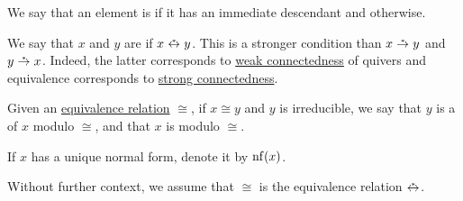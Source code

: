 \begin{definition}
\begin{thmenum}
    We say that an element is  if it has an immediate descendant and  otherwise.

     We say that \( x \) and \( y \) are  if \( x \reloset {*} \leftrightarrow y \). This is a stronger condition than \( x \reloset {*} \to y \) and \( y \reloset {*} \to x \). Indeed, the latter corresponds to \hyperref[def:quiver_connectedness/weak]{weak connectedness} of quivers and equivalence corresponds to \hyperref[def:quiver_connectedness/strong]{strong connectedness}.

     Given an \hyperref[def:equivalence_relation]{equivalence relation} \( \cong \), if \( x \cong y \) and \( y \) is irreducible, we say that \( y \) is a  of \( x \) modulo \( \cong \), and that \( x \) is  modulo \( \cong \).

    If \( x \) has a unique normal form, denote it by \( \operatorname{nf}(x) \).

    Without further context, we assume that \( \cong \) is the equivalence relation \( \reloset {*} \leftrightarrow \).
  \end{thmenum}
\end{definition}

